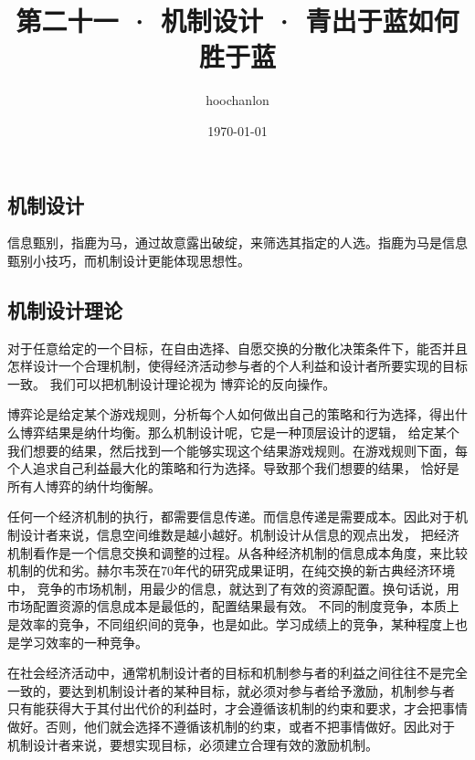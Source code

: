 \documentclass[12pt, a4paper]{article} %
\title{第二十一 · 机制设计 · 青出于蓝如何胜于蓝}
\author{hoochanlon}
\date{\today}
\begin{document}
	\begin{CJK*}{UTF8}{gbsn}
		\maketitle
        \clearpage
        \section{机制设计}
        信息甄别，指鹿为马，通过故意露出破绽，来筛选其指定的人选。指鹿为马是信息甄别小技巧，而机制设计更能体现思想性。
        \subsection{机制设计理论}
        对于任意给定的一个目标，在自由选择、自愿交换的分散化决策条件下，能否并且怎样设计一个合理机制，使得经济活动参与者的个人利益和设计者所要实现的目标一致。
        我们可以把机制设计理论视为 博弈论的反向操作。\par
        博弈论是给定某个游戏规则，分析每个人如何做出自己的策略和行为选择，得出什么博弈结果是纳什均衡。那么机制设计呢，它是一种顶层设计的逻辑，
        给定某个我们想要的结果，然后找到一个能够实现这个结果游戏规则。在游戏规则下面，每个人追求自己利益最大化的策略和行为选择。导致那个我们想要的结果，
        恰好是所有人博弈的纳什均衡解。\par

        任何一个经济机制的执行，都需要信息传递。而信息传递是需要成本。因此对于机制设计者来说，信息空间维数是越小越好。机制设计从信息的观点出发，
        把经济机制看作是一个信息交换和调整的过程。从各种经济机制的信息成本角度，来比较机制的优和劣。赫尔韦茨在70年代的研究成果证明，在纯交换的新古典经济环境中，
        竞争的市场机制，用最少的信息，就达到了有效的资源配置。换句话说，用市场配置资源的信息成本是最低的，配置结果最有效。
        不同的制度竞争，本质上是效率的竞争，不同组织间的竞争，也是如此。学习成绩上的竞争，某种程度上也是学习效率的一种竞争。\par

        在社会经济活动中，通常机制设计者的目标和机制参与者的利益之间往往不是完全一致的，要达到机制设计者的某种目标，就必须对参与者给予激励，机制参与者
        只有能获得大于其付出代价的利益时，才会遵循该机制的约束和要求，才会把事情做好。否则，他们就会选择不遵循该机制的约束，或者不把事情做好。因此对于
        机制设计者来说，要想实现目标，必须建立合理有效的激励机制。 \par


\end{CJK*}
\end{document}

